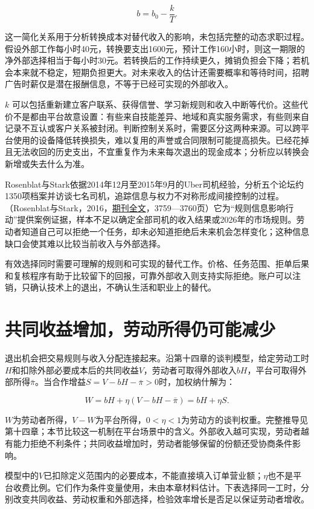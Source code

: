 \documentclass[UTF8,fontset=windows,12pt,a4paper,oneside,openany]{ctexbook}
\begin{document}
\[
b=b_0-\frac{k}{T}.
\]

这一简化关系用于分析转换成本对替代收入的影响，未包括完整的动态求职过程。假设外部工作每小时40元，转换要支出1600元，预计工作160小时，则这一期限的净外部选择相当于每小时30元。若转换后的工作持续更久，摊销负担会下降；若机会本来就不稳定，短期负担更大。对未来收入的估计还需要概率和等待时间，招聘广告时薪仅是潜在报酬信息，不等于已经可实现的外部收入。

$k$ 可以包括重新建立客户联系、获得信誉、学习新规则和收入中断等代价。这些代价不是都由平台故意设置：有些来自技能差异、地域和真实服务需求，有些则来自记录不互认或客户关系被封闭。判断控制关系时，需要区分这两种来源。可以跨平台使用的设备降低转换损失，难以复用的声誉或合同限制可能提高损失。已经花掉且无法收回的历史支出，不宜重复作为未来每次退出的现金成本；分析应以转换会新增或失去什么为准。

Rosenblat与Stark依据2014年12月至2015年9月的Uber司机经验，分析五个论坛约1350项档案并访谈七名司机，追踪信息与权力不对称形成间接控制的过程。（Rosenblat与Stark，2016，\href{https://ijoc.org/index.php/ijoc/article/download/4892/1739}{期刊全文}，3759—3760页）它为“规则信息影响行动”提供案例证据，样本不足以确定全部司机的收入结果或2026年的市场规则。劳动者知道自己可以拒绝一个任务，却未必知道拒绝后未来机会怎样变化；这种信息缺口会使其难以比较当前收入与外部选择。

有效选择同时需要可理解的规则和可实现的替代工作。价格、任务范围、拒单后果和复核程序有助于比较留下的回报，可靠外部收入则支持实际拒绝。账户可以注销，只确认技术上的退出，不确认生活和职业上的替代。

\section{共同收益增加，劳动所得仍可能减少}

退出机会把交易规则与收入分配连接起来。沿第十四章的谈判模型，给定劳动工时$H$和扣除外部必要成本后的共同收益$V$，劳动者可取得外部收入$bH$，平台可取得外部所得$\bar\pi$。当合作增益$S=V-bH-\bar\pi>0$时，加权纳什解为：

\[
W=bH+\eta(V-bH-\bar\pi)=bH+\eta S.
\]

$W$为劳动者所得，$V-W$为平台所得，$0<\eta<1$为劳动方的谈判权重。完整推导见第十四章；本节比较这一机制在平台场景中的含义。外部收入越可实现，劳动者越有能力拒绝不利条件；共同收益增加时，劳动者能够保留的份额还受协商条件影响。

模型中的$V$已扣除定义范围内的必要成本，不能直接填入订单营业额；$\eta$也不是平台收费比例。它们作为条件变量使用，未由本章材料估计。下表选择同一工时，分别改变共同收益、劳动权重和外部选择，检验效率增长是否足以保证劳动者增收。
\end{document}
